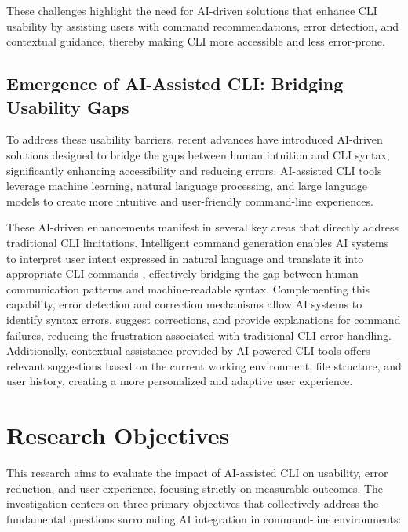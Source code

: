These challenges highlight the need for AI-driven solutions that enhance CLI usability by assisting users with command recommendations, error detection, and contextual guidance, thereby making CLI more accessible and less error-prone.

\subsection{Emergence of AI-Assisted CLI: Bridging Usability Gaps}

To address these usability barriers, recent advances have introduced AI-driven solutions designed to bridge the gaps between human intuition and CLI syntax, significantly enhancing accessibility and reducing errors. AI-assisted CLI tools leverage machine learning, natural language processing, and large language models to create more intuitive and user-friendly command-line experiences.

These AI-driven enhancements manifest in several key areas that directly address traditional CLI limitations. Intelligent command generation enables AI systems to interpret user intent expressed in natural language and translate it into appropriate CLI commands \cite{spinellis2023}, effectively bridging the gap between human communication patterns and machine-readable syntax. Complementing this capability, error detection and correction mechanisms allow AI systems to identify syntax errors, suggest corrections, and provide explanations for command failures, reducing the frustration associated with traditional CLI error handling. Additionally, contextual assistance provided by AI-powered CLI tools offers relevant suggestions based on the current working environment, file structure, and user history, creating a more personalized and adaptive user experience.

\section{Research Objectives}

This research aims to evaluate the impact of AI-assisted CLI on usability, error reduction, and user experience, focusing strictly on measurable outcomes. The investigation centers on three primary objectives that collectively address the fundamental questions surrounding AI integration in command-line environments:

